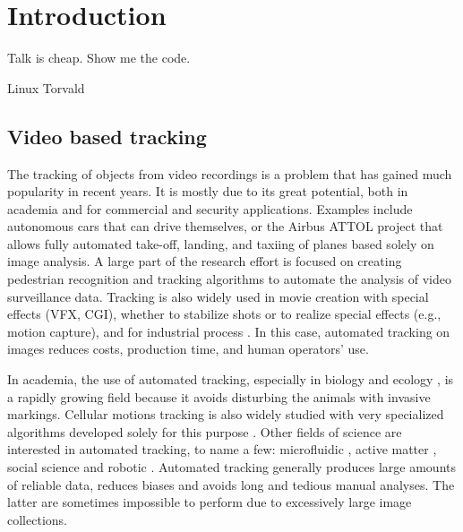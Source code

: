 \chapter{Introduction}

  \epigraph{Talk is cheap. Show me the code.}{Linux Torvald}

	\section{Video based tracking}
    The tracking of objects from video recordings is a problem that has gained much popularity in recent years. It is mostly due to its great potential, both in academia and for commercial and security applications. Examples include autonomous cars that can drive themselves, or the Airbus ATTOL project \cite{ATTOL} that allows fully automated take-off, landing, and taxiing of planes based solely on image analysis. A large part of the research effort is focused on creating pedestrian recognition and tracking algorithms to automate the analysis of video surveillance data. Tracking is also widely used in movie creation with special effects (VFX, CGI), whether to stabilize shots or to realize special effects (e.g., motion capture), and for industrial process \cite{luo1988adaptive}. In this case, automated tracking on images reduces costs, production time, and human operators' use.

    In academia, the use of automated tracking, especially in biology and ecology \cite{dell2014automated,risse2017fimtrack}, is a rapidly growing field because it avoids disturbing the animals with invasive markings. Cellular motions tracking is also widely studied with very specialized algorithms developed solely for this purpose \cite{juang2009tracking,dewan2011tracking}. Other fields of science are interested in automated tracking, to name a few: microfluidic \cite{jeong2018accurately}, active matter \cite{bricard2013emergence}, social science \cite{ali2012multiple} and robotic \cite{treptow2004real}. Automated tracking generally produces large amounts of reliable data, reduces biases and avoids long and tedious manual analyses. The latter are sometimes impossible to perform due to excessively large image collections.

